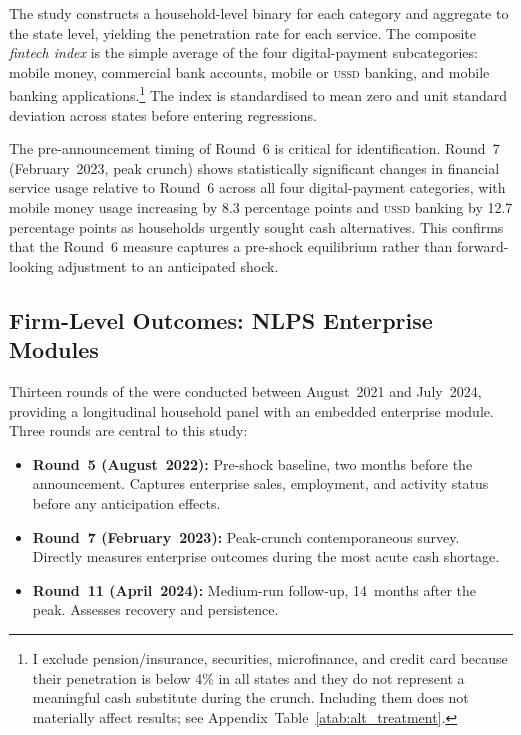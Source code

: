 The study constructs a household-level binary for each category and aggregate to the
state level, yielding the penetration rate for each service. The composite
\emph{fintech index} is the simple average of the four digital-payment
subcategories: mobile money, commercial bank accounts, mobile or \textsc{ussd}
banking, and mobile banking applications.\footnote{%
  I exclude pension/insurance, securities, microfinance, and credit card
  because their penetration is below 4\% in all states and they do not
  represent a meaningful cash substitute during the crunch. Including them
  does not materially affect results; see Appendix~Table~\ref{atab:alt_treatment}.}
The index is standardised to mean zero and unit standard deviation across
states before entering regressions.

The pre-announcement timing of Round~6 is critical for identification. Round~7
(February~2023, peak crunch) shows statistically significant changes in
financial service usage relative to Round~6 across all four digital-payment
categories, with mobile money usage increasing by 8.3 percentage points and
\textsc{ussd} banking by 12.7 percentage points as households urgently
sought cash alternatives. This confirms that the Round~6 measure captures
a pre-shock equilibrium rather than forward-looking adjustment to an
anticipated shock.

\subsection{Firm-Level Outcomes: NLPS Enterprise Modules}
\label{sub:nlps_enterprise}

Thirteen rounds of the \NLPS{} were conducted between August~2021 and
July~2024, providing a longitudinal household panel with an embedded
enterprise module. Three rounds are central to this study:

\begin{itemize}[noitemsep]
  \item \textbf{Round~5 (August~2022):} Pre-shock baseline, two months
    before the \CBN{} announcement. Captures enterprise sales, employment,
    and activity status before any anticipation effects.
  \item \textbf{Round~7 (February~2023):} Peak-crunch contemporaneous
    survey. Directly measures enterprise outcomes during the most acute
    cash shortage.
  \item \textbf{Round~11 (April~2024):} Medium-run follow-up, 14~months
    after the peak. Assesses recovery and persistence.
\end{itemize}

